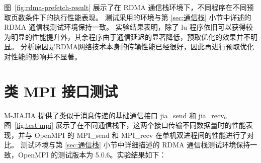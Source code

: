 {    图~\ref{fig:rdma-prefetch-result} 展示了在 RDMA 通信栈环境下，不同程序在不同预取页数条件下的执行性能表现。
    测试采用的环境与第 \ref{sec:通信栈}  小节中详述的 RDMA 通信栈测试环境保持一致。
    实验结果表明，除了 lu 程序依旧可以获得较为明显的性能提升外，其余程序由于通信延迟的显著降低，预取优化的效果并不明显。
    分析原因是RDMA网络技术本身的传输性能已经很好，因此再进行预取优化对性能的影响并不显著。

    \section{类 MPI 接口测试}\label{sec:类 MPI 接口测试}
    M-JIAJIA 提供了类似于消息传递的基础通信接口 jia\_send 和 jia\_recv。
    图~\ref{fig:test-mpi} 展示了在不同通信栈下，这两个接口传输不同数据量时的性能表现，并与 OpenMPI 的 MPI\_send 和 MPI\_recv 在单机双进程间的性能进行了对比。
    测试环境与第 \ref{sec:通信栈} 小节中详细描述的 RDMA 通信栈测试环境保持一致，OpenMPI 的测试版本为 5.0.6。实验结果如下：

}
